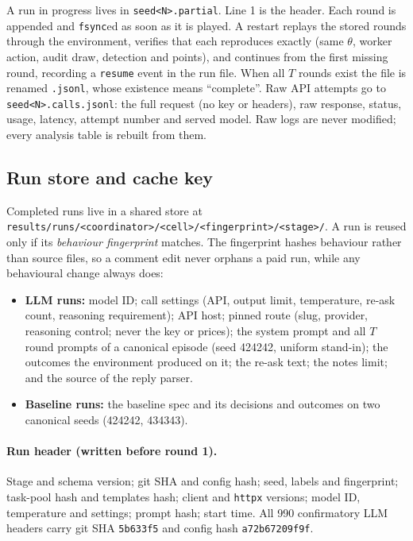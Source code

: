 \documentclass[11pt,letterpaper]{article}
\numberwithin{equation}{section}
\numberwithin{table}{section}
\numberwithin{figure}{section}
\numberwithin{algorithm}{section}
\begin{document}
A run in progress lives in \texttt{seed<N>.partial}. Line 1 is the header. Each round is appended and \texttt{fsync}ed as soon as it is played. A restart replays the stored rounds through the environment, verifies that each reproduces exactly (same $\theta$, worker action, audit draw, detection and points), and continues from the first missing round, recording a \texttt{resume} event in the run file. When all $T$ rounds exist the file is renamed \texttt{.jsonl}, whose existence means ``complete''. Raw API attempts go to \texttt{seed<N>.calls.jsonl}: the full request (no key or headers), raw response, status, usage, latency, attempt number and served model. Raw logs are never modified; every analysis table is rebuilt from them.

\subsection{Run store and cache key}

Completed runs live in a shared store at\\ \texttt{results/\allowbreak runs/\allowbreak <coordinator>/\allowbreak <cell>/\allowbreak <fingerprint>/\allowbreak <stage>/}. A run is reused only if its \emph{behaviour fingerprint} matches. The fingerprint hashes behaviour rather than source files, so a comment edit never orphans a paid run, while any behavioural change always does:
\begin{itemize}
  \item \textbf{LLM runs:} model ID; call settings (API, output limit, temperature, re-ask count, reasoning requirement); API host; pinned route (slug, provider, reasoning control; never the key or prices); the system prompt and all $T$ round prompts of a canonical episode (seed 424242, uniform stand-in); the outcomes the environment produced on it; the re-ask text; the notes limit; and the source of the reply parser.
  \item \textbf{Baseline runs:} the baseline spec and its decisions and outcomes on two canonical seeds (424242, 434343).
\end{itemize}
\paragraph{Run header (written before round 1).} Stage and schema version; git SHA and config hash; seed, labels and fingerprint; task-pool hash and templates hash; client and \texttt{httpx} versions; model ID, temperature and settings; prompt hash; start time. All 990 confirmatory LLM headers carry git SHA \texttt{5b633f5} and config hash \texttt{a72b67209f9f}.
\end{document}
